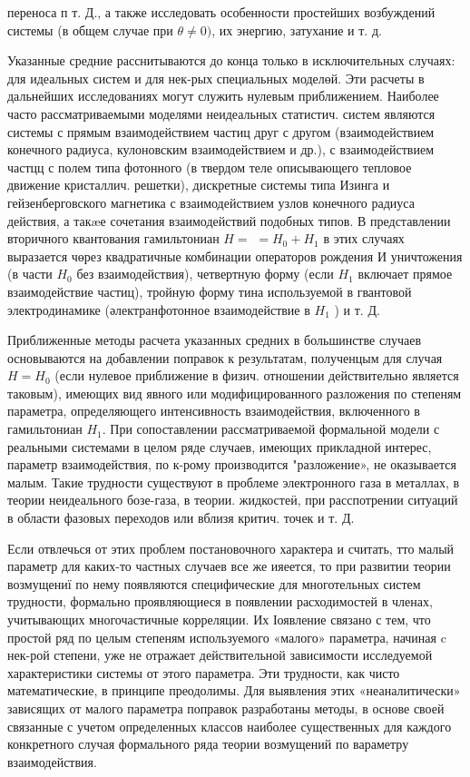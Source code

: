 \documentclass[10pt]{article}
\begin{document}
переноса п т. Д., а также исследовать особенности простейших возбуждений системы (в общем случае при $\theta \neq 0)$, их энергию, затухание и т. д.



Указанные средние расснитываются до конца только в исключительных случаях: для идеальных систем и для нек-рых специальных моделөй. Эти расчеты в дальнейших исследованиях могут служить нулевым приближением. Наиболее часто рассматриваемыми моделями неидеальных статистич. систем являются системы с прямым взаимодействием частиц друг с другом (взаимодействием конечного радиуса, кулоновским взаимодействием и др.), с взаимодействием частцц с полем типа фотонного (в твердом теле описывающего тепловое движение кристаллич. решетки), дискретные системы типа Изинга и гейзенберговского магнетика с взаимодействием узлов конечного радиуса действия, а такæе сочетания взаимодействий подобных типов. В представлении вторичного квантования гамильтониан $H=$ $=H_{0}+H_{1}$ в этих случаях выразается чөрез квадратичные комбинации операторов рождения И уничтожения (в части $H_{0}$ без взаимодействия), четвертную форму (если $H_{1}$ включает прямое взаимодействие частиц), тройную форму тина используемой в гвантовой электродинамике (әлектранфотонное взаимодействие в $H_{1}$ ) и т. Д.



Приближенные методы расчета указанных средних в большинстве случаев основываются на добавлении поправок к результатам, полученцым для случая $H=H_{0}$ (если нулевое приближение в физич. отношении действительно является таковым), имеющих вид явного или модифицированного разложения по степеням параметра, определяющего интенсивность взаимодействия, включенного в гамильтониан $H_{1}$. При сопоставлении рассматриваемой формальной модели с реальными системами в целом ряде случаев, имеющих прикладной интерес, параметр взаимодействия, по к-рому производится "разложение», не оказывается малым. Такие трудности существуют в проблеме электронного газа в металлах, в теории неидеального бозе-газа, в теории. жидкостеӥ, при расспотрении ситуаций в области фазовых переходов или вблизя критич. точек и т. Д.



Если отвлечься от этих проблем постановочного характера и считать, тто малый параметр для каких-то частных случаев все же ияеется, то при развитии теории возмущениї по нему появляются специфические для многотельных систем трудности, формально проявляющиеся в появлении расходимостей в членах, учитывающих многочастичные корреляции. Их Іоявление связано с тем, что простой ряд по целым степеням используемого «малого» параметра, начиная c нек-рой степени, уже не отражает действительной зависимости исследуемой характеристики системы от этого параметра. Эти трудности, как чисто математические, в принципе преодолимы. Для выявления этих «неаналитически» зависящих от малого параметра поправок разработаны методы, в основе своей связанные с учетом определенных классов наиболее существенных для каждого конкретного случая формального ряда теории возмущений по вараметру взаимодействия.
\end{document}
